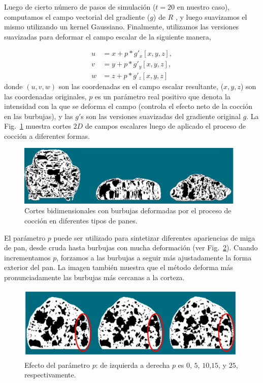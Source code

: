Luego de cierto número de pasos de simulación ($t=20$ en nuestro caso), computamos el campo vectorial del gradiente ($g$) de $R$ \cite{Gonzalez2006}, y luego suavizamos el mismo utilizando un kernel Gaussiano.
Finalmente, utilizamos las versiones suavizadas para deformar el campo escalar de la siguiente manera,

\begin{align*}
\displaystyle
u &= x+p*g'_{x}[x,y,z],\\
v &= y+p*g'_{y}[x,y,z],\\
w &= z+p*g'_{z}[x,y,z]
\end{align*}
donde $(u,v,w)$ son las coordenadas en el campo escalar resultante, ($x,y,z$) son las coordenadas originales, $p$ es un parámetro real positivo que denota la intensidad con la que se deforma el campo (controla el efecto neto de la cocción en las burbujas), y las $g'$s son las versiones suavizadas del gradiente original $g$.
La Fig.~\ref{fg:bakedbubbles} muestra cortes $2D$ de campos escalares luego de aplicado el proceso de cocción a diferentes formas.

\begin{figure}
\includegraphics[width=13cm]{figures/bakedbubbles}
\caption{Cortes bidimensionales con burbujas deformadas por el proceso de cocción en diferentes tipos de panes.}
\label{fg:bakedbubbles}
\end{figure}

El parámetro $p$ puede ser utilizado para sintetizar diferentes apariencias de miga de pan, desde cruda hasta burbujas con mucha deformación (ver Fig.~\ref{fg:parameterp}).
Cuando incrementamos $p$, forzamos a las burbujas a seguir más ajustadamente la forma exterior del pan. 
La imagen también muestra que el método deforma más pronunciadamente las burbujas más cercanas a la corteza.

\begin{figure}
\includegraphics[width=13cm]{figures/parameterp}
\caption[Efecto del parámetro $p$ en la simulación de cocción]{Efecto del parámetro $p$: de izquierda a derecha $p$ es $0$, $5$, $10$,$15$, y $25$, respectivamente.}
\label{fg:parameterp}
\end{figure}



